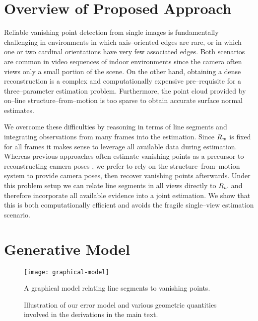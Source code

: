 \section{Overview of Proposed Approach}

Reliable vanishing point detection from single images is fundamentally
challenging in environments in which axis--oriented edges are rare, or
in which one or two cardinal orientations have very few associated
edges. Both scenarios are common in video sequences of indoor
environments since the camera often views only a small portion of the
scene. On the other hand, obtaining a dense reconstruction is a
complex and computationally expensive pre--requisite for a
three--parameter estimation problem. Furthermore, the point cloud
provided by on--line structure--from--motion is too sparse to obtain
accurate surface normal estimates.

We overcome these difficulties by reasoning in terms of line
segments and integrating observations from many frames into the
estimation. Since $\SceneR$ is fixed for all frames it makes sense to
leverage all available data during estimation. Whereas previous
approaches often estimate vanishing points as a precursor to
reconstructing camera poses \cite{Zhang02,Werner2002}, we prefer to rely
on the structure--from--motion system to provide camera poses,
then recover vanishing points afterwards. Under this problem setup we
can relate line segments in all views directly to $\SceneR$ and
therefore incorporate all available evidence into a joint
estimation. We show that this is both computationally efficient and
avoids the fragile single--view estimation scenario.

\section{Generative Model}

\begin{figure}[tb]
  \centering
  \texttt{[image: graphical-model]}
  \caption{A graphical model relating line segments to vanishing
    points.}
  \label{fig:R-graphical}
\end{figure}

\begin{figure}[tb]
  \centering
  \qquad
  \caption{Illustration of our error model and various geometric
    quantities involved in the derivations in the main text.}
  \label{fig:line-model}
\end{figure}

